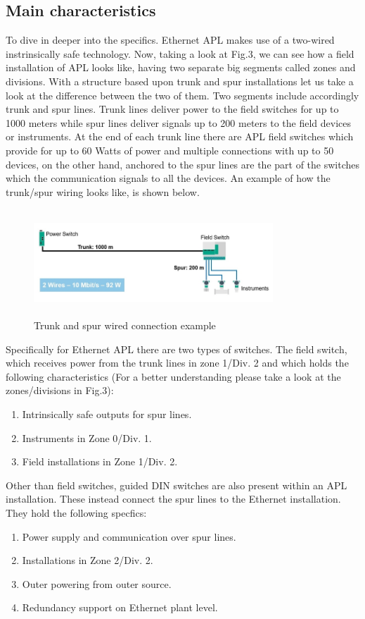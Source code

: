 \documentclass[conference]{IEEEtran}
\begin{document}
\subsection{Main characteristics}
To dive in deeper into the specifics. Ethernet APL makes use of a two-wired instrinsically safe technology. Now, taking a look at Fig.3, we can see how a field installation of APL looks like, having two separate big segments called zones and divisions. With a structure based upon trunk and spur installations let us take a look at the difference between the two of them. Two segments include accordingly trunk and spur lines. Trunk lines deliver power to the field switches for up to 1000 meters while spur lines deliver signals up to 200 meters to the field devices or instruments. At the end of each trunk line there are APL field switches which provide for up to 60 Watts of power and multiple connections with up to 50 devices, on the other hand, anchored to the spur lines are the part of the switches which the communication signals to all the devices. An example of how the trunk/spur wiring looks like, is shown below.
\begin{figure}[htbp]
    \centerline{\includegraphics[width=90mm, height=40mm, scale=0.5]{trunkspur.jpg}}
    \caption{Trunk and spur wired connection example \cite{b7}}
    \label{trsp}
\end{figure}

Specifically for Ethernet APL there are two types of switches. The field switch, which receives power from the trunk lines in zone 1/Div. 2 and which holds the following characteristics (For a better understanding please take a look at the zones/divisions in Fig.3):
\begin{enumerate}
\item Intrinsically safe outputs for spur lines.
\item Instruments in Zone 0/Div. 1.
\item Field installations in Zone 1/Div. 2.
\end{enumerate}

Other than field switches, guided DIN switches are also present within an APL installation. These instead connect the spur lines to the Ethernet installation. They hold the following specfics:
\begin{enumerate}
\item Power supply and communication over spur lines.
\item Installations in Zone 2/Div. 2.
\item Outer powering from outer source.
\item Redundancy support on Ethernet plant level.
\end{enumerate}
\end{document}
